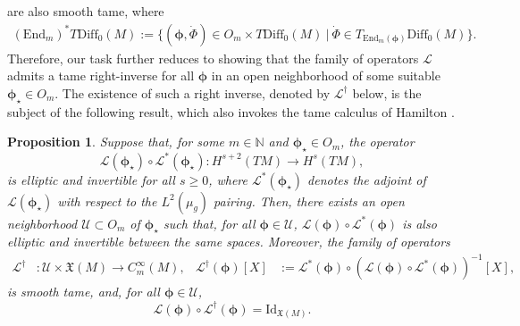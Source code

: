 \documentclass{article}
\newtheorem{proposition}[theorem]{Proposition}
\theoremstyle{remark}
\newcommand{\M}{M}
\newcommand{\CinfV}[1]{C_{#1}^{\infty}(\M)}
\newcommand{\X}{\mathfrak{X}(\M)}
\newcommand{\Diff}{\mathrm{Diff}_0(\M)}
\begin{document}
%
are also smooth tame, where 
%
\begin{align*}
    (\mathrm{End}_{m})^*T\Diff:= \{(\bm{\phi},\dot{\Phi})\in O_m\times T\Diff~|~\dot{\Phi}\in T_{\mathrm{End}_{m}(\bm{\phi})}\Diff\}.
\end{align*}
%
Therefore, our task further reduces to showing that the family of operators $\mathcal{L}$ admits a tame right-inverse for all $\bm{\phi}$ in an open neighborhood of some suitable $\bm{\phi}_\star\in O_m$.
%
The existence of such a right inverse, denoted by $\mathcal{L}^\dagger$ below, is the subject of the following result, which also invokes the tame calculus of Hamilton \cite[Part~II, Section 3.3]{Hamilton1982}.
%
\begin{proposition}\label{prop:tame_inverse}
    Suppose that, for some $m\in\mathbb{N}$ and $\bm{\phi}_\star\in O_m$, the operator 
    $$
    \mathcal{L}(\bm{\phi}_\star)\circ \mathcal{L}^*(\bm{\phi}_\star):H^{s+2}(T\M)\rightarrow H^{s}(T\M),
    $$
    is elliptic and invertible for all $s\geq 0$, where $\mathcal{L}^*(\bm{\phi}_\star)$ denotes the adjoint of $\mathcal{L}(\bm{\phi}_\star)$ with respect to the $L^2(\mu_g)$ pairing. Then, there exists an open neighborhood $\mathcal{U}\subset O_m$ of $\bm{\phi}_\star$ such that, for all $\bm{\phi}\in \mathcal{U}$,
    $
    \mathcal{L}(\bm{\phi})\circ \mathcal{L}^*(\bm{\phi})
    $
    is also elliptic and invertible between the same spaces. Moreover, the family of operators 
    \begin{align*}
        \mathcal{L}^\dagger&:\mathcal{U}\times\X\rightarrow\CinfV{m}, & \mathcal{L}^\dagger(\bm{\phi})[X]&:= \mathcal{L}^*(\bm{\phi})\circ (\mathcal{L}(\bm{\phi})\circ \mathcal{L}^*(\bm{\phi}))^{-1}[X],
    \end{align*}
    is smooth tame, and, for all $\bm{\phi}\in \mathcal{U}$, 
    $$
    \mathcal{L}(\bm{\phi})\circ\mathcal{L}^\dagger(\bm{\phi}) = \mathrm{Id}_{\X}.
    $$
\end{proposition}
%
\end{document}
